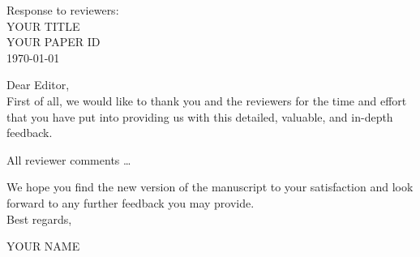\documentclass[a4paper,11pt, parskip=half]{scrartcl}
\newcommand{\paperid}{YOUR PAPER ID}
\begin{document}
\thispagestyle{plain}

\begin{center}
Response to reviewers: \\[1em]

 {\Large YOUR TITLE} \vspace{0.5cm} \\
 {\paperid{}} \vspace{0.5cm} \\
 \today \vspace{0.5cm} \\
\end{center}


Dear Editor, \\

First of all, we would like to thank you and the reviewers for the time and effort that you have put into providing us with this detailed, valuable, and in-depth feedback.

All reviewer comments …

We hope you find the new version of the manuscript to your satisfaction and look forward to any further feedback you may provide.
\\[3em]
Best regards,

YOUR NAME

\newpage


% 
% 
\end{document}

